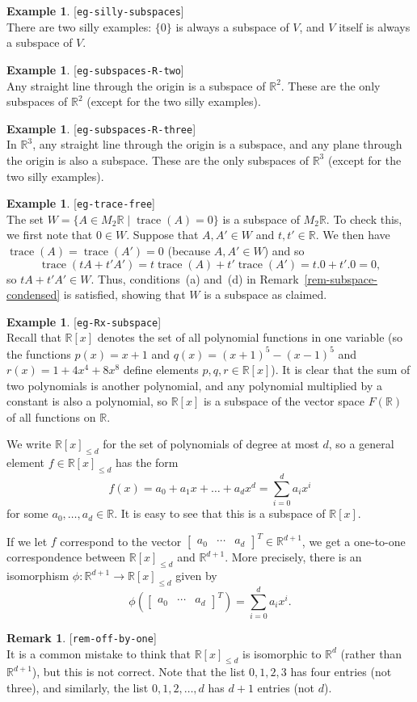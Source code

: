 \documentclass{amsart}
\newcommand{\lbl}[1]{\label{#1}\textup{[\texttt{#1}]}\ \\}
\newcommand{\lbl}{\label}
\newcommand{\R}         {{\mathbb{R}}}
\newcommand{\trc}       {\operatorname{trace}}
\newcommand{\bsm}       {\left[\begin{smallmatrix}}
\newcommand{\esm}       {\end{smallmatrix}\right]}
\newcommand{\st}        {\;|\;}
\renewcommand{\:}       {\colon}
\theoremstyle{definition}
\newtheorem{remark}[theorem]{Remark}
\newtheorem{example}[theorem]{Example}
\begin{document}
\begin{example}\lbl{eg-silly-subspaces}
 There are two silly examples: $\{0\}$ is always a subspace
 of $V$, and $V$ itself is always a subspace of $V$.
\end{example}

\begin{example}\lbl{eg-subspaces-R-two}
 Any straight line through the origin is a subspace of
 $\R^2$.  These are the only subspaces of $\R^2$ (except for
 the two silly examples).
\end{example}

\begin{example}\lbl{eg-subspaces-R-three}
 In $\R^3$, any straight line through the origin is a
 subspace, and any plane through the origin is also a
 subspace.  These are the only subspaces of $\R^3$ (except
 for the two silly examples).
\end{example}

\begin{example}\lbl{eg-trace-free}
 The set $W=\{A\in M_2\R\st\trc(A)=0\}$ is a subspace of
 $M_2\R$.  To check this, we first note that $0\in W$.  
 Suppose that $A,A'\in W$ and
 $t,t'\in\R$.  We then have $\trc(A)=\trc(A')=0$
 (because $A,A'\in W$) and so 
 \[ \trc(tA+t'A')=t \trc(A)+t' \trc(A') = t.0+t'.0=0,
 \] 
 so $tA+t'A'\in W$.  Thus, conditions~(a) and~(d) in
 Remark~\ref{rem-subspace-condensed} is satisfied, showing
 that $W$ is a subspace as claimed.
\end{example}

\begin{example}\lbl{eg-Rx-subspace}
 Recall that $\R[x]$ denotes the set of all polynomial
 functions in one variable (so the functions $p(x)=x+1$ and
 $q(x)=(x+1)^5-(x-1)^5$ and $r(x)=1+4x^4+8x^8$ define
 elements $p,q,r\in\R[x]$).  It is clear that the sum of two
 polynomials is another polynomial, and any polynomial
 multiplied by a constant is also a polynomial, so $\R[x]$
 is a subspace of the vector space $F(\R)$ of all functions on
 $\R$.

 We write $\R[x]_{\leq d}$ for the set of polynomials of
 degree at most $d$, so a general element $f\in\R[x]_{\leq
  d}$ has the form
 \[ f(x) =
     a_0 + a_1x + \ldots + a_d x^d = \sum_{i=0}^d a_ix^i
 \]
 for some $a_0,\ldots,a_d\in\R$.  It is easy to see that
 this is a subspace of $\R[x]$.
  
 If we let $f$ correspond to the vector
 $\bsm a_0&\dotsb&a_d\esm^T\in\R^{d+1}$, we get a one-to-one
 correspondence between $\R[x]_{\leq d}$ and $\R^{d+1}$.
 More precisely, there is an isomorphism
 $\phi\:\R^{d+1}\to\R[x]_{\leq d}$ given by 
 \[ \phi(\bsm a_0&\dotsb&a_d\esm^T) = 
     \sum_{i=0}^d a_i x^i.
 \]
\end{example}
\begin{remark}\lbl{rem-off-by-one}
 It is a common mistake to think that $\R[x]_{\leq d}$ is
 isomorphic to $\R^d$ (rather than $\R^{d+1}$), but this is
 not correct.  Note that the list $0,1,2,3$ has four entries
 (not three), and similarly, the list $0,1,2,\dotsc,d$ has
 $d+1$ entries (not $d$).
\end{remark}
\end{document}

